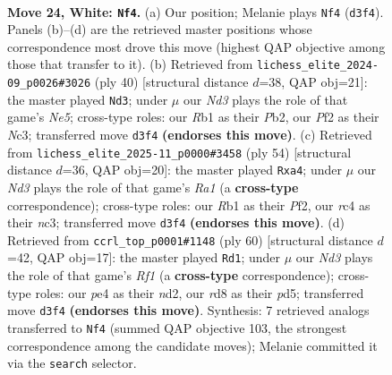 \documentclass[11pt]{article}
\begin{document}
\clearpage

\begin{figure}[p]\centering
\begin{subfigure}{0.46\textwidth}\centering
\resizebox{\linewidth}{!}{%
\newchessgame
\chessboard[
  setfen={2kr4/ppp4R/8/5p2/2r1p3/3N4/PP2KP1P/1R6 w - - 0 24},
  showmover=false,
  pgfstyle=straightmove, color=movearrow, markmove={d3-f4}
]}
\caption{}
\end{subfigure}\hfill
\begin{subfigure}{0.46\textwidth}\centering
\resizebox{\linewidth}{!}{%
\newchessgame
\chessboard[
  setfen={r4r2/6pp/p3kp2/4N3/8/2N5/PPP2RPP/2K5 w - - 1 21},
  showmover=false,
  pgfstyle=straightmove, color=movearrow, markmove={e5-d3}
]}
\caption{}
\end{subfigure}
\\[4pt]
\begin{subfigure}{0.46\textwidth}\centering
\resizebox{\linewidth}{!}{%
\newchessgame
\chessboard[
  setfen={5rk1/5pp1/1R2p2p/8/r1N5/2n1P3/5PPP/R5K1 w - - 0 28},
  showmover=false,
  pgfstyle=straightmove, color=movearrow, markmove={a1-a4}
]}
\caption{}
\end{subfigure}\hfill
\begin{subfigure}{0.46\textwidth}\centering
\resizebox{\linewidth}{!}{%
\newchessgame
\chessboard[
  setfen={r7/p2r4/6k1/1R1p1Npp/8/4P3/P2n1PP1/5RK1 w - - 0 31},
  showmover=false,
  pgfstyle=straightmove, color=movearrow, markmove={f1-d1}
]}
\caption{}
\end{subfigure}
\caption{\textbf{Move 24, White: \texttt{Nf4}.} (a) Our position; Melanie plays \texttt{Nf4} (\texttt{d3f4}). Panels (b)--(d) are the retrieved master positions whose correspondence most drove this move (highest QAP objective among those that transfer to it). (b) Retrieved from \texttt{lichess\_elite\_2024-09\_p0026\#3026} (ply 40) [structural distance $d$=38, QAP obj=21]: the master played \texttt{Nd3}; under $\mu$ our \emph{Nd3} plays the role of that game's \emph{Ne5}; cross-type roles: our \emph{R}b1 as their \emph{P}b2, our \emph{P}f2 as their \emph{N}c3; transferred move \texttt{d3f4} \textbf{(endorses this move)}. (c) Retrieved from \texttt{lichess\_elite\_2025-11\_p0000\#3458} (ply 54) [structural distance $d$=36, QAP obj=20]: the master played \texttt{Rxa4}; under $\mu$ our \emph{Nd3} plays the role of that game's \emph{Ra1} (a \textbf{cross-type} correspondence); cross-type roles: our \emph{R}b1 as their \emph{P}f2, our \emph{r}c4 as their \emph{n}c3; transferred move \texttt{d3f4} \textbf{(endorses this move)}. (d) Retrieved from \texttt{ccrl\_top\_p0001\#1148} (ply 60) [structural distance $d$=42, QAP obj=17]: the master played \texttt{Rd1}; under $\mu$ our \emph{Nd3} plays the role of that game's \emph{Rf1} (a \textbf{cross-type} correspondence); cross-type roles: our \emph{p}e4 as their \emph{n}d2, our \emph{r}d8 as their \emph{p}d5; transferred move \texttt{d3f4} \textbf{(endorses this move)}. Synthesis: 7 retrieved analogs transferred to \texttt{Nf4} (summed QAP objective 103, the strongest correspondence among the candidate moves); Melanie committed it via the \texttt{search} selector.}
\label{fig:thought-m46}
\end{figure}
\end{document}
